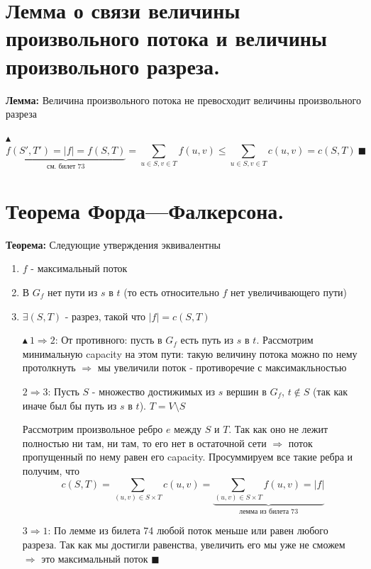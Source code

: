 \setcounter{section}{73}
\section{Лемма о связи величины произвольного потока и величины произвольного разреза.}
\par \textbf{Лемма:} Величина произвольного потока не превосходит величины произвольного разреза
\par $\blacktriangle$ $$\underbrace{f(S', T')=|f|=f(S,T)}_\text{см. билет 73}=\sum_{u \in S, v \in T} f(u,v) \leq \sum_{u \in S, v \in T} c(u,v)=c(S,T) \: \blacksquare$$

\setcounter{section}{74}
\section{Теорема Форда—Фалкерсона.}
\par \textbf{Теорема:} Следующие утверждения эквивалентны
\begin{enumerate}
    \item $f$ - максимальный поток
    \item В $G_f$ нет пути из $s$ в $t$ (то есть относительно $f$ нет увеличивающего пути)
    \item $\exists (S,T)$ - разрез, такой что $|f|=c(S,T)$
\end{enumerate}
\par \begin{itemize}
    \item[$\blacktriangle \: 1 \Rightarrow 2$:] От противного: пусть в $G_f$ есть путь из $s$ в $t$. Рассмотрим минимальную capacity на этом пути: такую величину потока можно по нему протолкнуть $\Rightarrow$ мы увеличили поток - противоречие с максимакльностью
    \item[$2 \Rightarrow 3$:] Пусть $S$ - множество достижимых из $s$ вершин в $G_f$, $t \not\in S$ (так как иначе был бы путь из $s$ в $t$). $T=V \setminus S$
    \par Рассмотрим произвольное ребро $e$ между $S$ и $T$. Так как оно не лежит полностью ни там, ни там, то его нет в остаточной сети $\Rightarrow$ поток пропущенный по нему равен его capacity. Просуммируем все такие ребра и получим, что $$c(S,T)=\sum_{(u,v) \in S\times T} c(u,v)=\underbrace{\sum_{(u,v) \in S\times T} f(u,v)=|f|}_\text{лемма из билета 73}$$
    \item[$3 \Rightarrow 1$:] По лемме из билета 74 любой поток меньше или равен любого разреза. Так как мы достигли равенства, увеличить его мы уже не сможем $\Rightarrow$ это максимальный поток $\blacksquare$
\end{itemize}

